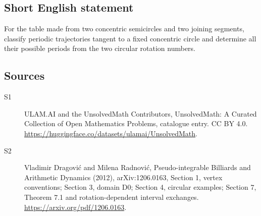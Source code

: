 \documentclass[11pt]{article}
\begin{document}
\subsection{Short English statement}
For the table made from two concentric semicircles and two joining segments, classify periodic trajectories tangent to a fixed concentric circle and determine all their possible periods from the two circular rotation numbers.
\subsection{Sources}
\begin{description}
\item[\hypertarget{source:statement:1}{S1}] ULAM.AI and the UnsolvedMath Contributors, UnsolvedMath: A Curated Collection of Open Mathematics Problems, catalogue entry. CC BY 4.0. \url{https://huggingface.co/datasets/ulamai/UnsolvedMath}.
\item[\hypertarget{source:statement:2}{S2}] Vladimir Dragović and Milena Radnović, Pseudo-integrable Billiards and Arithmetic Dynamics (2012), arXiv:1206.0163, Section 1, vertex conventions; Section 3, domain D0; Section 4, circular examples; Section 7, Theorem 7.1 and rotation-dependent interval exchanges. \url{https://arxiv.org/pdf/1206.0163}.
\end{description}
\label{end:statement}
\end{document}
